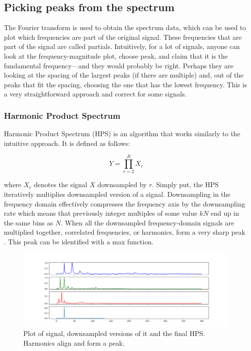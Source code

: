\subsection{Picking peaks from the spectrum}
The Fourier transform is used to obtain the spectrum data, which can be used to plot which frequencies are part of the original signal. These frequencies that are part of the signal are called partials. Intuitively, for a lot of signals, anyone can look at the frequency-magnitude plot, choose peak, and claim that it is the fundamental frequency—and they would probably be right. Perhaps they are looking at the spacing of the largest peaks (if there are multiple) and, out of the peaks that fit the spacing, choosing the one that has the lowest frequency. This is a very straightforward approach and correct for some signals. 

\subsubsection{Harmonic Product Spectrum}
Harmonic Product Spectrum (HPS) is an algorithm that works similarly to the intuitive approach. It is defined as follows:

$$Y = \prod_{r=2}^R X_r$$

where $X_r$ denotes the signal $X$ downsampled by $r$. Simply put, the HPS iteratively multiplies downsampled version of a signal. Downsampling in the frequency domain effectively compresses the frequency axis by the downsampling rate which means that previously integer multiples of some value $kN$ end up in the same bins as $N$. When all the downsampled frequency-domain signals are multiplied together, correlated frequencies, or harmonics, form a very sharp peak \cite{McLeod2008}. This peak can be identified with a max function.

\begin{figure}[ht]
    \centering
    \includegraphics[width=\textwidth]{./images/hps.png}
    \caption{Plot of signal, downsampled versions of it and the final HPS. Harmonics align and form a peak. \label{fig:hps}}
\end{figure}

